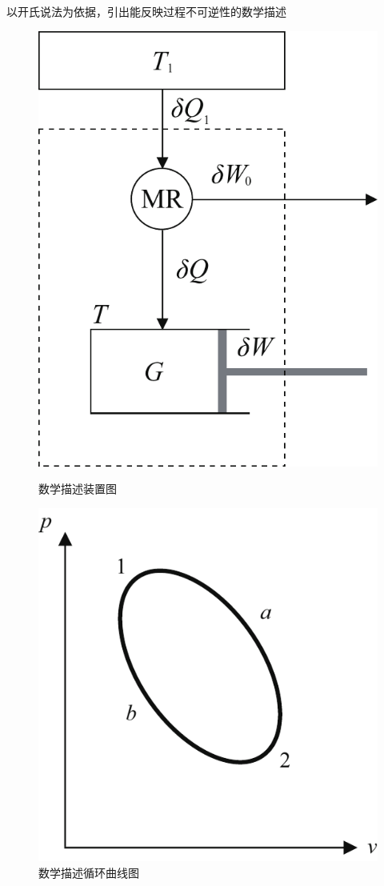 \noindent 以开氏说法为依据，引出能反映过程不可逆性的数学描述
\begin{figure}[!htb]
\begin{minipage}{0.5\linewidth}
		\centering
		\includegraphics[width=0.5\linewidth]{pic/数学描述.pdf}
		\caption{数学描述装置图}
		\label{数学描述}
\end{minipage}
\begin{minipage}{0.5\linewidth}
		\centering
		\includegraphics[width=0.62\linewidth]{pic/数学描述曲线.pdf}
		\caption{数学描述循环曲线图}
		\label{数学描述曲线}
\end{minipage}
\end{figure}
\vspace*{-1em}
